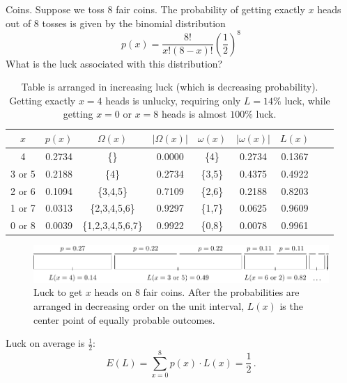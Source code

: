 \begin{example}{Coins.}
Suppose we toss 8 fair coins.  The probability of getting exactly $x$ heads out of 8 tosses is given by the binomial distribution
\begin{equation}
p(x)=\frac{8!}{x!(8-x)!}\left(\frac{1}{2}\right)^8
\end{equation}
What is the luck associated with this distribution?
\begin{table}
\caption{Table is arranged in increasing luck (which is decreasing probability). Getting exactly $x=4$ heads is unlucky, requiring only $L=14\%$ luck, while getting $x=0$ or $x=8$ heads is almost $100\%$ luck.}
\begin{tabular}{|c|S[table-format=2.4]|c|S[table-format=2.4]|c|S[table-format=2.4]|c|S[table-format=2.4]|S[table-format=2.4]|}
 &
 &
 &
 &
 &
 &
 \\
 & 0.2734 &  \{\} & 0.0000 & \{4\} & 0.2734 & 0.1367 \\
3 or 5 & 0.2188 & \{4\} & 0.2734 & \{3,5\} & 0.4375 & 0.4922 \\
2 or 6 & 0.1094 & \{3,4,5\} & 0.7109 & \{2,6\} & 0.2188 & 0.8203 \\
1 or 7 & 0.0313 & \{2,3,4,5,6\} & 0.9297 & \{1,7\} & 0.0625 & 0.9609 \\
0 or 8 & 0.0039 & \{1,2,3,4,5,6,7\} & 0.9922 & \{0,8\} & 0.0078 & 0.9961 \\
\hline
\end{tabular}
\end{table}
\begin{figure}
\begin{center}
\includegraphics[width=1.00\linewidth]{graphics/arrange.pdf}
\end{center}
\caption{Luck to get $x$ heads on $8$ fair coins.  After the probabilities are arranged in decreasing order on the unit interval, $L(x)$ is the center point of equally probable outcomes.}
\label{fig:arrange}
\end{figure}

Luck on average is $\frac{1}{2}$:
\begin{equation}
E(L)=\sum_{x=0}^8 p(x) \cdot L(x) = \frac{1}{2} \,.
\end{equation}


\end{example}
